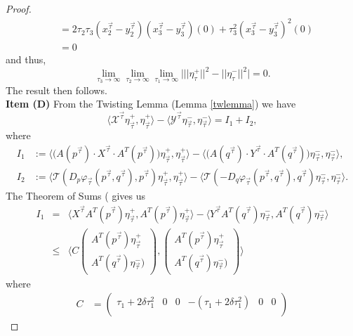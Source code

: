 \documentclass[reqno]{amsart}
\begin{document}
\begin{proof}
\begin{align*}
&=2\tau_2\tau_3(x^{\vec{\tau}}_2-y^{\vec{\tau}}_2)(x^{\vec{\tau}}_3-y^{\vec{\tau}}_3)(0)+\tau_3^2(x^{\vec{\tau}}_3-y^{\vec{\tau}}_3)^2(0)\\
&=0
\end{align*}
and thus,
\[\lim_{\tau_3\to \infty}\lim_{\tau_2\to \infty}\lim_{\tau_1\to \infty}\big|||\eta_\tau^+||^2-||\eta_\tau^-||^2\big|=0.\]
The result then follows. \\
\textbf{Item (D)}
From the Twisting Lemma (Lemma \ref{twlemma}) we have 
\begin{equation*}
\langle \mathcal{X}^{\vec{\tau}}\eta^+_{\vec{\tau}}, \eta^+_{\vec{\tau}}\rangle - 
\langle \mathcal{Y}^{\vec{\tau}}\eta^-_{\vec{\tau}}, \eta^-_{\vec{\tau}}\rangle = I_1 + I_2,
\end{equation*}
where
\begin{align*}
I_1 &:= \Big\langle \Big(A(p^{\vec{\tau}})\cdot X^{\vec{\tau}} \cdot A^T(p^{\vec{\tau}})\Big)  \eta^+_{\vec{\tau}}, \eta^+_{\vec{\tau}} \Big\rangle
-  \Big\langle \Big(A(q^{\vec{\tau}})\cdot Y^{\vec{\tau}} \cdot A^T(q^{\vec{\tau}})\Big)  \eta^-_{\vec{\tau}}, \eta^-_{\vec{\tau}} \Big\rangle, \\
I_2 &:= \langle \mathcal{T}(D_p \varphi_{\vec{\tau}}(p^{\vec{\tau}}, q^{\vec{\tau}}), p^{\vec{\tau}})  \eta^+_{\vec{\tau}}, \eta^+_{\vec{\tau}}\rangle
 -\langle \mathcal{T}(-D_q \varphi_{\vec{\tau}}(p^{\vec{\tau}}, q^{\vec{\tau}}), q^{\vec{\tau}})  \eta^-_{\vec{\tau}}, \eta^-_{\vec{\tau}}\rangle.
\end{align*}
The Theorem of Sums (\cite[Theorem 3.2]{CIL:UGTVS} gives us  
\begin{eqnarray*}
I_1 & = & 
 \langle X^{\vec{\tau}}A^T(p^{\vec{\tau}})\eta^+_{\vec{\tau}},A^T(p^{\vec{\tau}})\eta^+_{\vec{\tau}}\rangle-
  \langle Y^{\vec{\tau}}A^T(q^{\vec{\tau}})\eta^-_{\vec{\tau}},A^T(q^{\vec{\tau}})\eta^-_{\vec{\tau}}\rangle\\
  & \leq & \Bigg\langle C \begin{pmatrix} A^T(p^{\vec{\tau}})\eta^+_{\vec{\tau}} \\ A^T(q^{\vec{\tau}})\eta^-_{\vec{\tau}})\end{pmatrix}, \begin{pmatrix} A^T(p^{\vec{\tau}})\eta^+_{\vec{\tau}} \\ A^T(q^{\vec{\tau}})\eta^-_{\vec{\tau}})\end{pmatrix} \Bigg\rangle
\end{eqnarray*}
where
\begin{align*}
C& = \begin{pmatrix} \tau_1+2\delta\tau_1^2 & 0 & 0&-(\tau_1+2\delta\tau_1^2)&0&0\\  

\end{pmatrix}
\end{align*}
\end{proof}
\end{document}

